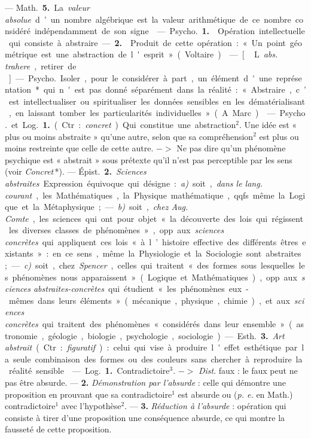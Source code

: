 \begin{itemize}[leftmargin=1cm, label=, itemsep=1pt]
 — \si{Math.} {\bf 5.} La {\it valeur absolue} d’un
nombre algébrique est la valeur
arithmétique de ce nombre considéré
indépendamment de son signe.

 — \si{Psycho.} {\bf 1.}  Opération
intellectuelle qui consiste à
abstraire. — {\bf 2.}  Produit de cette
opération : « Un point géométrique est
une abstraction de l'esprit » (Voltaire).

 — [\,L. {\it abs. trahere}, retirer de\,]
— \si{Psycho.} Isoler, pour le considérer
à part, un élément d'une représentation*
qui n'est pas donné séparément
dans la réalité : « Abstraire,
c’est intellectualiser ou spiritualiser
les données sensibles en les dématérialisant,
en laissant tomber les
particularités individuelles » (A.
Marc).

 — \si{Psycho.} et \si{Log.} {\bf 1.} (Ctr. :
{\it concret}). Qui constitue une abstraction$^2$.
Une idée est « plus ou moins
abstraite » qu'une autre, selon que
sa compré\-hension$^2$ est plus ou
moins restreinte que celle de cette
autre. $->$ Ne pas dire qu’un phénomène
psychique est « abstrait »
sous prétexte qu'il n’est pas perceptible
par les sens (voir {\it Concret}\,*). —
\si{Épist.} {\bf 2.} {\it Sciences abstraites}. Expression
équivoque qui désigne : {\it a)} soit,
{\it dans le lang. courant}, les Mathématiques,
la Physique mathématique,
qqfs. même la Logique et la Métaphysique;
— {\it b)} soit, {\it chez Aug.
Comte}, les sciences qui ont pour
objet « la découverte des lois qui
régissent les diverses classes de phénomènes »,
opp. aux {\it sciences concrètes}
qui appliquent ces lois « à l’histoire
effective des différents êtres existants » :
en ce sens, même la Physiologie
et la Sociologie sont abstraites;
— {\it c)} soit, chez {\it Spencer}, celles qui
traitent « des formes sous lesquelles
les phénomènes nous apparaissent »
(Logique et Mathématiques), opp.
aux {\it sciences abstraites-concrètes} qui
étudient « les phénomènes eux-mêmes
dans leurs éléments » (mécanique,
physique, chimie), et aux
{\it sciences concrètes} qui traitent des
phénomènes « considérés dans leur
ensemble » (astronomie, géologie,
biologie, psychologie, sociologie).

— \si{Esth.} {\bf 3.} {\it Art abstrait} (Ctr : {\it figuratif}) : celui qui vise à produire
l'effet esthétique par la seule combinaison des formes ou des couleurs
sans chercher à reproduire la réalité
sensible.

 — \si{Log.} {\bf 1.} Contradictoire$^3$.
$->$ {\it Dist}. faux : le faux peut ne pas
être absurde. — {\bf 2.} {\it Démonstration
par l'absurde} : celle qui démontre
une proposition en prouvant que sa
contradictoire$^1$ est absurde ou ({\it p. e.}
en Math.) contradictoire$^1$ avec l’hypothèse$^2$. — {\bf 3.} {\it Réduction à l'absurde} :
opération qui consiste à tirer d’une
proposition une conséquence absurde,
ce qui montre la fausseté de cette
proposition.


\end{itemize}
